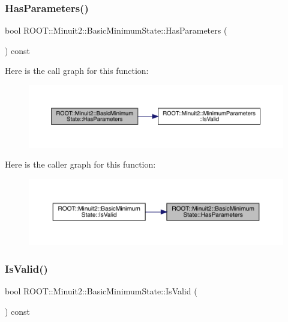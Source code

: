 \subsubsection{\texorpdfstring{HasParameters()}{HasParameters()}\hspace{0.1cm}{\footnotesize\ttfamily [2/2]}}
{\footnotesize\ttfamily bool R\+O\+O\+T\+::\+Minuit2\+::\+Basic\+Minimum\+State\+::\+Has\+Parameters (\begin{DoxyParamCaption}{ }\end{DoxyParamCaption}) const\hspace{0.3cm}{\ttfamily [inline]}}

Here is the call graph for this function\+:
\nopagebreak
\begin{figure}[H]
\begin{center}
\leavevmode
\includegraphics[width=350pt]{d0/db1/classROOT_1_1Minuit2_1_1BasicMinimumState_a1af83c0464c727dc173834c1612f5e49_cgraph}
\end{center}
\end{figure}
Here is the caller graph for this function\+:\nopagebreak
\begin{figure}[H]
\begin{center}
\leavevmode
\includegraphics[width=350pt]{d0/db1/classROOT_1_1Minuit2_1_1BasicMinimumState_a1af83c0464c727dc173834c1612f5e49_icgraph}
\end{center}
\end{figure}
\mbox{\label{classROOT_1_1Minuit2_1_1BasicMinimumState_af92e32efe08fa047bc433db6f058d11a}} 
\subsubsection{\texorpdfstring{IsValid()}{IsValid()}\hspace{0.1cm}{\footnotesize\ttfamily [1/2]}}
{\footnotesize\ttfamily bool R\+O\+O\+T\+::\+Minuit2\+::\+Basic\+Minimum\+State\+::\+Is\+Valid (\begin{DoxyParamCaption}{ }\end{DoxyParamCaption}) const\hspace{0.3cm}{\ttfamily [inline]}}

